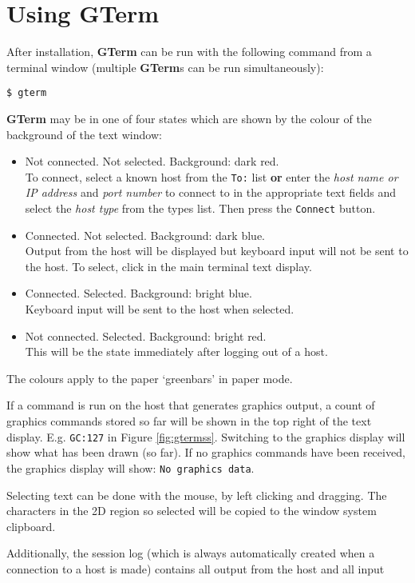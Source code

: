 \documentclass[a4paper,twoside,11pt]{article}
\newcommand{\newpara}{\par\vspace{4mm}\noindent}
\begin{document}
\section{Using \textbf{GTerm}}
After installation, \textbf{GTerm} can be run with the following command from a terminal window (multiple \textbf{GTerm}s
can be run simultaneously):
\begin{lstlisting}
$ gterm
\end{lstlisting}

\newpara
\textbf{GTerm} may be in one of four states which are shown by the colour of the background of the text window:
\begin{itemize}
\item Not connected. Not selected. Background: dark red.\\
      To connect, select a known host from the \texttt{To:} list \textbf{or} enter the \textit{host name or IP address}
      and \textit{port number} to connect to in the appropriate
      text fields and select the \textit{host type} from the types list. Then press the \texttt{Connect} button.
\item Connected. Not selected. Background: dark blue.\\
      Output from the host will be displayed but keyboard input will not be sent to the host.
      To select, click in the main terminal text display.
\item Connected. Selected. Background: bright blue.\\
      Keyboard input will be sent to the host when selected.
\item Not connected. Selected. Background: bright red.\\
      This will be the state immediately after logging out of a host.
\end{itemize}
The colours apply to the paper `greenbars' in paper mode.
\newpara
If a command is run on the host that generates graphics output, a count of graphics commands
stored so far will be shown in the top right of the text display. E.g. \texttt{GC:127} in Figure \ref{fig:gtermss}.
Switching to the graphics display will show what has been drawn (so far). If no graphics commands have been
received, the graphics display will show: \texttt{No graphics data}.
\newpara
Selecting text can be done with the mouse, by left clicking and dragging. The characters in the 2D region so selected
will be copied to the window system clipboard.  
\newpara
Additionally, the session log (which is always
automatically created when a connection to a host is made) contains all output from the host and all input
\end{document}
